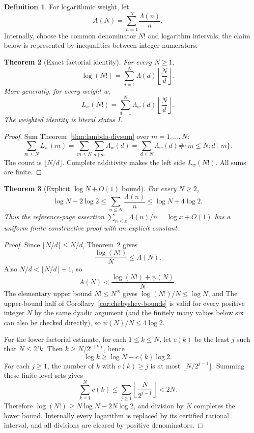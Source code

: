 \documentclass[11pt]{article}
\newtheorem{theorem}{Theorem}[section]
\theoremstyle{definition}
\newtheorem{definition}[theorem]{Definition}
\newcommand{\StatusI}{\textsf{I}}
\begin{document}
\begin{definition}
For logarithmic weight, let
\[
 A(N)=\sum_{n=1}^{N}\frac{\Lambda(n)}n.
\]
Internally, choose the common denominator \(N!\) and logarithm intervals; the
claim below is represented by inequalities between integer numerators.
\end{definition}

\begin{theorem}[Exact factorial identity]\label{thm:factorial-lambda}
For every \(N\ge1\),
\[
 \boxed{\displaystyle
 \log(N!)=\sum_{d=1}^{N}\Lambda(d)\left\lfloor\frac Nd\right\rfloor.}
\]
More generally, for every weight \(w\),
\[
 L_w(N!)=\sum_{d=1}^{N}\Lambda_w(d)\left\lfloor\frac Nd\right\rfloor.
\]
The weighted identity is literal status \StatusI.
\end{theorem}

\begin{proof}
Sum Theorem~\ref{thm:lambda-divsum} over \(m=1,\ldots,N\):
\[
 \sum_{m\le N}L_w(m)
 =\sum_{m\le N}\sum_{d\mid m}\Lambda_w(d)
 =\sum_{d\le N}\Lambda_w(d)\#\{m\le N:d\mid m\}.
\]
The count is \(\lfloor N/d\rfloor\).  Complete additivity makes the left side
\(L_w(N!)\).  All sums are finite.
\end{proof}

\begin{theorem}[Explicit \(\log N+O(1)\) bound]\label{thm:harmonic-lambda}
For every \(N\ge2\),
\[
 \boxed{\log N-2\log2\le
 \sum_{n\le N}\frac{\Lambda(n)}n
 \le\log N+4\log2.}
\]
Thus the reference-page assertion
\(\sum_{n\le x}\Lambda(n)/n=\log x+O(1)\) has a uniform finite constructive
proof with an explicit constant.
\end{theorem}

\begin{proof}
Since \(\lfloor N/d\rfloor\le N/d\),
Theorem~\ref{thm:factorial-lambda} gives
\[
 \frac{\log(N!)}N\le A(N).
\]
Also \(N/d<\lfloor N/d\rfloor+1\), so
\[
 A(N)<\frac{\log(N!)+\psi(N)}N.
\]
The elementary upper bound \(N!\le N^N\) gives
\(\log(N!)/N\le\log N\), and
The upper-bound half of Corollary~\ref{cor:chebyshev-bounds} is valid for every positive integer \(N\) by the same dyadic argument (and the finitely many values below six can also be checked directly), so
\(\psi(N)/N\le4\log2\).

For the lower factorial estimate, for each \(1\le k\le N\), let \(c(k)\) be
the least \(j\) such that \(N\le2^jk\).  Then
\(k\ge N/2^{c(k)}\), hence
\[
 \log k\ge\log N-c(k)\log2.
\]
For each \(j\ge1\), the number of \(k\) with \(c(k)\ge j\) is at most
\(\lfloor N/2^{j-1}\rfloor\).  Summing these finite level sets gives
\[
 \sum_{k=1}^{N}c(k)
 \le\sum_{j\ge1}\left\lfloor\frac N{2^{j-1}}\right\rfloor<2N.
\]
Therefore
\(
 \log(N!)\ge N\log N-2N\log2
\), and division by \(N\) completes the lower bound.  Internally every
logarithm is replaced by its certified rational interval, and all divisions
are cleared by positive denominators.
\end{proof}
\end{document}
